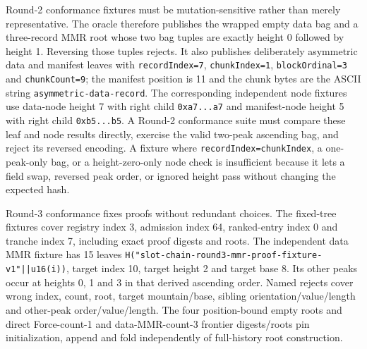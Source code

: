 \documentclass[a4paper,11pt]{article}
\newcommand{\code}[1]{\nolinkurl{#1}}
\begin{document}
Round-2 conformance fixtures must be mutation-sensitive rather than merely
representative.  The oracle therefore publishes the wrapped empty data bag and
a three-record MMR root whose two bag tuples are exactly height 0 followed by
height 1.  Reversing those tuples rejects.  It also publishes deliberately
asymmetric data and manifest leaves with
\code{recordIndex=7}, \code{chunkIndex=1}, \code{blockOrdinal=3} and
\code{chunkCount=9}; the manifest position is 11 and the chunk bytes are the
ASCII string \code{asymmetric-data-record}.  The corresponding independent
node fixtures use data-node height 7 with right child \code{0xa7...a7} and
manifest-node height 5 with right child \code{0xb5...b5}.  A Round-2
conformance suite must compare these leaf and node results directly, exercise
the valid two-peak ascending bag, and reject its reversed encoding.  A fixture
where \code{recordIndex=chunkIndex}, a one-peak-only bag, or a height-zero-only
node check is insufficient because it lets a field swap, reversed peak order,
or ignored height pass without changing the expected hash.

Round-3 conformance fixes proofs without redundant choices.  The fixed-tree
fixtures cover registry index 3, admission index 64, ranked-entry index 0 and
tranche index 7, including exact proof digests and roots.  The independent data
MMR fixture has 15 leaves
\code{H("slot-chain-round3-mmr-proof-fixture-v1"||u16(i))}, target index 10,
target height 2 and target base 8.  Its other peaks occur at heights 0, 1 and 3
in that derived ascending order.  Named rejects cover wrong index, count, root,
target mountain/base, sibling orientation/value/length and other-peak
order/value/length.  The four position-bound empty roots and direct Force-count-1 and
data-MMR-count-3 frontier digests/roots pin initialization, append and fold
independently of full-history root construction.
\end{document}
